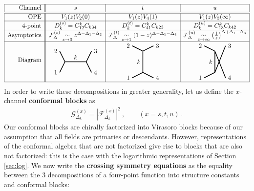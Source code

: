 \documentclass[12pt, a4paper]{article}
\theoremstyle{break}
\begin{document}
\begin{align}
 \begin{array}{|r||c|c|c|}
  \hline 
  \text{Channel} & s & t & u
  \\ \hline\hline 
  \text{OPE} & V_1(z)V_2(0) & V_1(z)V_4(1) & V_1(z)V_3(\infty)
  \\ \hline 
  \text{4-point} & D^{(s)}_k = C_{12}^k C_{k34} & D^{(t)}_k = C_{41}^k C_{k23} & D^{(u)}_k = C_{13}^k C_{k42}
\\ \hline 
  \text{Asymptotics} & \mathcal{F}^{(s)}_{\Delta}\underset{z\to 0}{\sim} z^{\Delta-\Delta_1-\Delta_2} & \mathcal{F}^{(t)}_{\Delta}\underset{z\to 1}{\sim} (1-z)^{\Delta-\Delta_1-\Delta_4}
  & \mathcal{F}^{(u)}_\Delta  \underset{z\to \infty}{\sim} \left(\tfrac{1}{z}\right)^{\Delta+\Delta_1-\Delta_3}
  \\
  \hline 
\text{Diagram} & 
\begin{tikzpicture}[baseline=(current  bounding  box.center), very thick, scale = .3]
\draw (-1,2) node [left] {$2$} -- (0,0) -- node [above] {$k$} (4,0) -- (5,2) node [right] {$3$};
\draw (-1,-2) node [left] {$1$} -- (0,0);
\draw (4,0) -- (5,-2) node [right] {$4$};
\end{tikzpicture}
& 
\begin{tikzpicture}[baseline=(current  bounding  box.center), very thick, scale = .3]
 \draw (-2,3) node [left] {$2$} -- (0,2) -- node [left] {$k$} (0,-2) -- (-2, -3) node [left] {$1$};
\draw (0,2) -- (2,3) node [right] {$3$};
\draw (0,-2) -- (2, -3) node [right] {$4$};
\end{tikzpicture}
& 
\begin{tikzpicture}[baseline=(current  bounding  box.center), very thick, scale = .3]
\draw (-2,1) node [left] {$2$} -- (0,0) -- node [left] {$k$} (0,-4) ;
\draw (0,0)-- (2,-5) node [right] {$4$};
\draw (-2,-5) node [left] {$1$} -- (0,-4);
\draw (0,-4) -- (2,1) node [right] {$3$};
\end{tikzpicture} 
  \\
  \hline 
 \end{array}
 \label{stu}
\end{align}
In order to write these decompositions in greater generality, let us define the $x$-channel \textbf{conformal blocks} as 
\begin{align}
 \mathcal{G}^{(x)}_{\Delta_k} = \left|\mathcal{F}_{\Delta_k}^{(x)}\right|^2\ , \qquad (x=s,t,u)\ . 
 \label{gf2}
\end{align}
Our conformal blocks are chirally factorized into Virasoro blocks because of our assumption that all fields are primaries or descendants. However, representations of the conformal algebra that are not factorized give rise to blocks that are also not factorized: this is the case with the logarithmic representations of Section \ref{sec:log}. We now write the \textbf{crossing symmetry equations} as the equality between the 3 decompositions of a four-point function into structure constants and conformal blocks:
\end{document}
